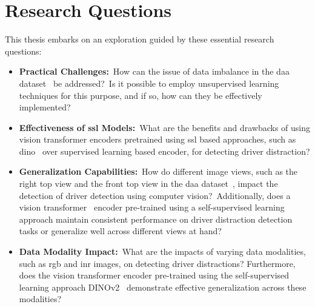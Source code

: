 \section{Research Questions}
\label{section:research_questions}
This thesis embarks on an exploration guided by these essential research questions:
\begin{itemize}
    \item \textbf{Practical Challenges:}~How can the issue of data imbalance in the \gls{daa} dataset~\citep{martin2019drive_and_act_2019_iccv} be addressed?~Is it possible to employ unsupervised learning techniques for this purpose, and if so, how can they be effectively implemented?
    
    \item \textbf{Effectiveness of \gls{ssl} Models:}~What are the benefits and drawbacks of using vision transformer encoders pretrained using \gls{ssl} based approaches, such as \gls{dino}~\citep{dinov2_oquab2023dinov2} over supervised learning based encoder, for detecting driver distraction?
    
    \item \textbf{Generalization Capabilities:}~How do different image views, such as the right top view and the front top view in the \gls{daa} dataset~\citep{martin2019drive_and_act_2019_iccv}, impact the detection of driver detection using computer vision?~Additionally, does a vision transformer~\citep{Vit_Paper_Dosovitskiy2020AnII} encoder pre-trained using a self-supervised learning approach maintain consistent performance on driver distraction detection tasks or generalize well across different views at hand?
    
    \item \textbf{Data Modality Impact:}~What are the impacts of varying data modalities, such as \gls{rgb} and \gls{inr} images, on detecting driver distractions? Furthermore, does the vision transformer encoder pre-trained using the self-supervised learning approach DINOv2~\citep{dinov2_oquab2023dinov2} demonstrate effective generalization across these modalities?
\end{itemize}

